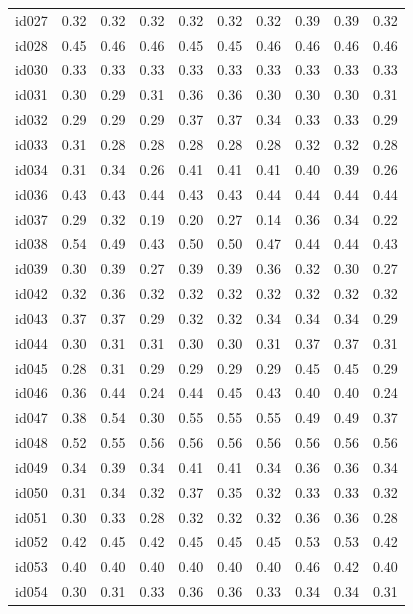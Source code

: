 \begin{tabular}{lrrrrrrrrr}
id027 & 0.32 & 0.32 & 0.32 & 0.32 & 0.32 & 0.32 & 0.39 & 0.39 & 0.32 \\
id028 & 0.45 & 0.46 & 0.46 & 0.45 & 0.45 & 0.46 & 0.46 & 0.46 & 0.46 \\
id030 & 0.33 & 0.33 & 0.33 & 0.33 & 0.33 & 0.33 & 0.33 & 0.33 & 0.33 \\
id031 & 0.30 & 0.29 & 0.31 & 0.36 & 0.36 & 0.30 & 0.30 & 0.30 & 0.31 \\
id032 & 0.29 & 0.29 & 0.29 & 0.37 & 0.37 & 0.34 & 0.33 & 0.33 & 0.29 \\
id033 & 0.31 & 0.28 & 0.28 & 0.28 & 0.28 & 0.28 & 0.32 & 0.32 & 0.28 \\
id034 & 0.31 & 0.34 & 0.26 & 0.41 & 0.41 & 0.41 & 0.40 & 0.39 & 0.26 \\
id036 & 0.43 & 0.43 & 0.44 & 0.43 & 0.43 & 0.44 & 0.44 & 0.44 & 0.44 \\
id037 & 0.29 & 0.32 & 0.19 & 0.20 & 0.27 & 0.14 & 0.36 & 0.34 & 0.22 \\
id038 & 0.54 & 0.49 & 0.43 & 0.50 & 0.50 & 0.47 & 0.44 & 0.44 & 0.43 \\
id039 & 0.30 & 0.39 & 0.27 & 0.39 & 0.39 & 0.36 & 0.32 & 0.30 & 0.27 \\
id042 & 0.32 & 0.36 & 0.32 & 0.32 & 0.32 & 0.32 & 0.32 & 0.32 & 0.32 \\
id043 & 0.37 & 0.37 & 0.29 & 0.32 & 0.32 & 0.34 & 0.34 & 0.34 & 0.29 \\
id044 & 0.30 & 0.31 & 0.31 & 0.30 & 0.30 & 0.31 & 0.37 & 0.37 & 0.31 \\
id045 & 0.28 & 0.31 & 0.29 & 0.29 & 0.29 & 0.29 & 0.45 & 0.45 & 0.29 \\
id046 & 0.36 & 0.44 & 0.24 & 0.44 & 0.45 & 0.43 & 0.40 & 0.40 & 0.24 \\
id047 & 0.38 & 0.54 & 0.30 & 0.55 & 0.55 & 0.55 & 0.49 & 0.49 & 0.37 \\
id048 & 0.52 & 0.55 & 0.56 & 0.56 & 0.56 & 0.56 & 0.56 & 0.56 & 0.56 \\
id049 & 0.34 & 0.39 & 0.34 & 0.41 & 0.41 & 0.34 & 0.36 & 0.36 & 0.34 \\
id050 & 0.31 & 0.34 & 0.32 & 0.37 & 0.35 & 0.32 & 0.33 & 0.33 & 0.32 \\
id051 & 0.30 & 0.33 & 0.28 & 0.32 & 0.32 & 0.32 & 0.36 & 0.36 & 0.28 \\
id052 & 0.42 & 0.45 & 0.42 & 0.45 & 0.45 & 0.45 & 0.53 & 0.53 & 0.42 \\
id053 & 0.40 & 0.40 & 0.40 & 0.40 & 0.40 & 0.40 & 0.46 & 0.42 & 0.40 \\
id054 & 0.30 & 0.31 & 0.33 & 0.36 & 0.36 & 0.33 & 0.34 & 0.34 & 0.31 \\

\end{tabular}
